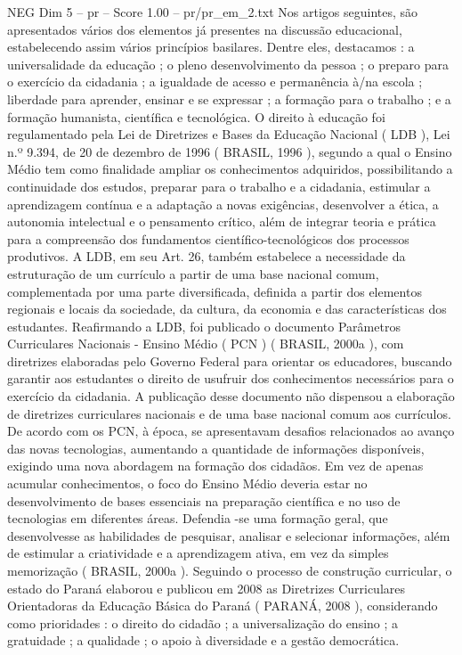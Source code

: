 \begin{textsample}{NEG Dim 5 – pr – Score 1.00 – pr/pr\_em\_2.txt}
Nos artigos seguintes, são apresentados vários dos elementos já presentes na discussão educacional, estabelecendo assim vários princípios basilares.
Dentre eles, destacamos : a universalidade da educação ; o pleno desenvolvimento da pessoa ; o preparo para o exercício da cidadania ; a igualdade de acesso e permanência à/na escola ; liberdade para aprender, ensinar e se expressar ; a formação para o trabalho ; e a formação humanista, científica e tecnológica.
O direito à educação foi regulamentado pela Lei de Diretrizes e Bases da Educação Nacional ( LDB ), Lei n.º 9.394, de 20 de dezembro de 1996 ( BRASIL, 1996 ), segundo a qual o Ensino Médio tem como finalidade ampliar os conhecimentos adquiridos, possibilitando a continuidade dos estudos, preparar para o trabalho e a cidadania, estimular a aprendizagem contínua e a adaptação a novas exigências, desenvolver a ética, a autonomia intelectual e o pensamento crítico, além de integrar teoria e prática para a compreensão dos fundamentos científico-tecnológicos dos processos produtivos.
A LDB, em seu Art. 26, também estabelece a necessidade da estruturação de um currículo a partir de uma base nacional comum, complementada por uma parte diversificada, definida a partir dos elementos regionais e locais da sociedade, da cultura, da economia e das características dos estudantes.
Reafirmando a LDB, foi publicado o documento Parâmetros Curriculares Nacionais - Ensino Médio ( PCN ) ( BRASIL, 2000a ), com diretrizes elaboradas pelo Governo Federal para orientar os educadores, buscando garantir aos estudantes o direito de usufruir dos conhecimentos necessários para o exercício da cidadania.
A publicação desse documento não dispensou a elaboração de diretrizes curriculares nacionais e de uma base nacional comum aos currículos.
De acordo com os PCN, à época, se apresentavam desafios relacionados ao avanço das novas tecnologias, aumentando a quantidade de informações disponíveis, exigindo uma nova abordagem na formação dos cidadãos.
Em vez de apenas acumular conhecimentos, o foco do Ensino Médio deveria estar no desenvolvimento de bases essenciais na preparação científica e no uso de tecnologias em diferentes áreas.
Defendia -se uma formação geral, que desenvolvesse as habilidades de pesquisar, analisar e selecionar informações, além de estimular a criatividade e a aprendizagem ativa, em vez da simples memorização ( BRASIL, 2000a ).
Seguindo o processo de construção curricular, o estado do Paraná elaborou e publicou em 2008 as Diretrizes Curriculares Orientadoras da Educação Básica do Paraná ( PARANÁ, 2008 ), considerando como prioridades : o direito do cidadão ; a universalização do ensino ; a gratuidade ; a qualidade ; o apoio à diversidade e a gestão democrática.

\end{textsample}

